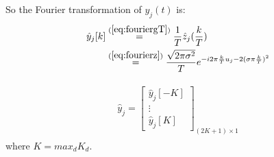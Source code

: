 \documentclass[12pt]{article}
\numberwithin{equation}{section}
\begin{document}
So the Fourier transformation of $y_j(t)$ is:
\begin{align}\begin{split}
	\hat{y}_j[k]
	&\stackrel{(\ref{eq:fouriergT})}{=} \frac{1}{T} \hat{z}_j(\frac{k}{T}) \\
	&\stackrel{(\ref{eq:fourierz})}{=} \frac{\sqrt{2\pi\sigma^2}}{T}e^{-i 2 \pi \frac{k}{T} u_j-2(\sigma \pi \frac{k}{T})^2} 
\end{split}\end{align} \par
\begin{align}\begin{split}
	\hat{y}_j=
	\begin{bmatrix}
		\hat{y}_j[-K] \\ \vdots \\ \hat{y}_j[K] 
	\end{bmatrix}_{(2K+1) \times 1}
\end{split}\end{align}
where $K=max_d K_d$.
\end{document}
